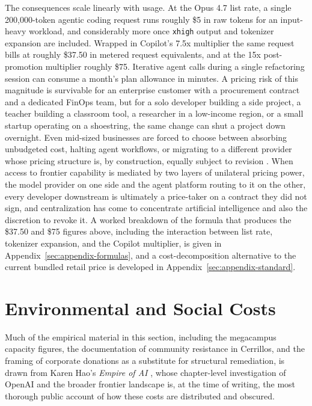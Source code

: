 \documentclass[10pt,a4paper,twocolumn]{article}
\begin{document}
The consequences scale linearly with usage. At the Opus 4.7 list rate, a single 200{,}000-token agentic coding request runs roughly \$5 in raw tokens for an input-heavy workload, and considerably more once \texttt{xhigh} output and tokenizer expansion are included. Wrapped in Copilot's 7.5x multiplier the same request bills at roughly \$37.50 in metered request equivalents, and at the 15x post-promotion multiplier roughly \$75. Iterative agent calls during a single refactoring session can consume a month's plan allowance in minutes. A pricing risk of this magnitude is survivable for an enterprise customer with a procurement contract and a dedicated FinOps team, but for a solo developer building a side project, a teacher building a classroom tool, a researcher in a low-income region, or a small startup operating on a shoestring, the same change can shut a project down overnight. Even mid-sized businesses are forced to choose between absorbing unbudgeted cost, halting agent workflows, or migrating to a different provider whose pricing structure is, by construction, equally subject to revision \citep{zeff2025anthropic}. When access to frontier capability is mediated by two layers of unilateral pricing power, the model provider on one side and the agent platform routing to it on the other, every developer downstream is ultimately a price-taker on a contract they did not sign, and centralization has come to concentrate artificial intelligence and also the discretion to revoke it. A worked breakdown of the formula that produces the \$37.50 and \$75 figures above, including the interaction between list rate, tokenizer expansion, and the Copilot multiplier, is given in Appendix~\ref{sec:appendix-formulas}, and a cost-decomposition alternative to the current bundled retail price is developed in Appendix~\ref{sec:appendix-standard}.

\section{Environmental and Social Costs}
\label{sec:environmental}

Much of the empirical material in this section, including the megacampus capacity figures, the documentation of community resistance in Cerrillos, and the framing of corporate donations as a substitute for structural remediation, is drawn from Karen Hao's \emph{Empire of AI} \citep{hao2025empire}, whose chapter-level investigation of OpenAI and the broader frontier landscape is, at the time of writing, the most thorough public account of how these costs are distributed and obscured.
\end{document}
